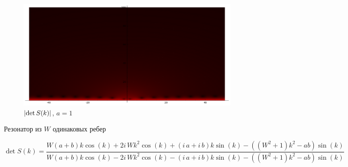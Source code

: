 \documentclass{beamer}
\begin{document}
\begin{frame}[plain]
\begin{figure}
\includegraphics[width=\textwidth,height=\textheight,keepaspectratio]{pic/detSa1.png}
\caption{$\abs{\det S(k)}$, $a = 1$}
\end{figure}
\end{frame}





\begin{frame}{Резонатор из $W$ одинаковых ребер}

\begin{figure}
\begin{tikzpicture}[scale=0.5]

\end{tikzpicture}
\end{figure}

{
\scriptsize
\[
\det S(k) = \frac{W {\left(a + b\right)} k \cos\left(k\right) + 2 i \, W k^{2} \cos\left(k\right) + {\left(i \, a + i \, b\right)} k \sin\left(k\right) - {\left({\left(W^{2} + 1\right)} k^{2} - a b\right)} \sin\left(k\right)}{W {\left(a + b\right)} k \cos\left(k\right) - 2 i \, W k^{2} \cos\left(k\right) - {\left(i \, a + i \, b\right)} k \sin\left(k\right) - {\left({\left(W^{2} + 1\right)} k^{2} - a b\right)} \sin\left(k\right)}
\]
}

\end{frame}

\end{document}
